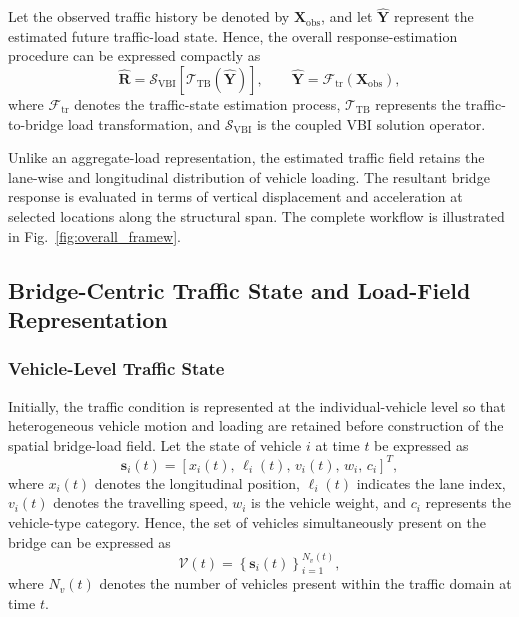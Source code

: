 \documentclass[journal]{IEEEtran}
\begin{document}
Let the observed traffic history be denoted by $\mathbf{X}_{\mathrm{obs}}$, and let $\widehat{\mathbf{Y}}$ represent the estimated future traffic-load state. Hence, the overall response-estimation procedure can be expressed compactly as
\begin{equation}
\widehat{\mathbf{R}} = \mathcal{S}_{\mathrm{VBI}}\left[\mathcal{T}_{\mathrm{TB}}\left(\widehat{\mathbf{Y}}\right)\right], \qquad \widehat{\mathbf{Y}} = \mathcal{F}_{\mathrm{tr}}\left(\mathbf{X}_{\mathrm{obs}}\right),
\label{eq:overall_framework}
\end{equation}
where $\mathcal{F}_{\mathrm{tr}}$ denotes the traffic-state estimation process, $\mathcal{T}_{\mathrm{TB}}$ represents the traffic-to-bridge load transformation, and $\mathcal{S}_{\mathrm{VBI}}$ is the coupled VBI solution operator.

Unlike an aggregate-load representation, the estimated traffic field retains the lane-wise and longitudinal distribution of vehicle loading. The resultant bridge response is evaluated in terms of vertical displacement and acceleration at selected locations along the structural span. The complete workflow is illustrated in Fig.~\ref{fig:overall_framew}.

\subsection{Bridge-Centric Traffic State and Load-Field Representation}
\label{sec:traffic_state_representation}
\subsubsection{Vehicle-Level Traffic State}
\label{subsec:vehicle_state}

Initially, the traffic condition is represented at the individual-vehicle level so that heterogeneous vehicle motion and loading are retained before construction of the spatial bridge-load field. Let the state of vehicle $i$ at time $t$ be expressed as
\begin{equation}
\mathbf{s}_{i}(t) = \left[x_i(t),\,\ell_i(t),\,v_i(t),\,w_i,\,c_i\right]^{T},
\label{eq:vehicle_state}
\end{equation}
where $x_i(t)$ denotes the longitudinal position, $\ell_i(t)$ indicates the lane index, $v_i(t)$ denotes the travelling speed, $w_i$ is the vehicle weight, and $c_i$ represents the vehicle-type category. Hence, the set of vehicles simultaneously present on the bridge can be expressed as
\begin{equation}
\mathcal{V}(t) = \left\{\mathbf{s}_{i}(t)\right\}_{i=1}^{N_v(t)},
\label{eq:vehicle_set}
\end{equation}
where $N_v(t)$ denotes the number of vehicles present within the traffic domain at time $t$.
\end{document}
